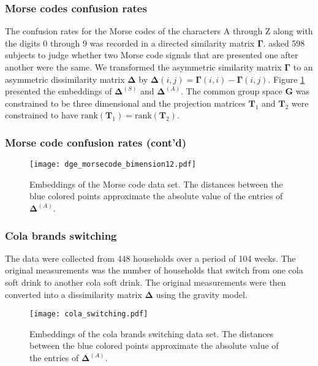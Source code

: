 \documentclass[professionalfonts,hyperref={pdfpagelabels=false,colorlinks=true,linkcolor=cyan}]{beamer}
\begin{document}
\begin{frame}
  \frametitle{Morse codes confusion rates}
  The confusion rates for the Morse codes of the characters A through
  Z along with the digits 0 through 9 was recorded in a directed
  similarity matrix $\mathbf{\Gamma}$. \cite{rothkopf57} asked 598
  subjects to judge whether two Morse code signals that are presented
  one after another were the same. We transformed the asymmetric
  similarity matrix $\bm{\Gamma}$ to an asymmetric dissimilarity
  matrix $\bm{\Delta}$ by $\bm{\Delta}(i,j) = \bm{\Gamma}(i,i) -
  \bm{\Gamma}(i,j)$. Figure \ref{fig:morsecode} presented the
  embeddings of $\bm{\Delta}^{(S)}$ and $\bm{\Delta}^{(A)}$. The
  common group space $\mathbf{G}$ was constrained to be three
  dimensional and the projection matrices $\mathbf{T}_1$ and
  $\mathbf{T}_2$ were constrained to have $\mathrm{rank}(\mathbf{T}_1)
  = \mathrm{rank}(\mathbf{T}_2)$. 
\end{frame}
\begin{frame}
  \frametitle{Morse code confusion rates (cont'd)}
\begin{figure}[htbp]
  \centering
    \texttt{[image: dge\_morsecode\_bimension12.pdf]}
    \caption{Embeddings of the Morse code data set. The
      distances between the blue colored points approximate the
      absolute value of the entries of $\bm{\Delta}^{(A)}$.}
  \label{fig:morsecode}
\end{figure}
\end{frame}

\begin{frame}
  \frametitle{Cola brands switching}
  The data were collected from 448 households over a period of 104
  weeks. The original measurements was the number of households that
  switch from one cola soft drink to another cola soft drink. The
  original measurements were then converted into a dissimilarity
  matrix $\bm{\Delta}$ using the gravity model. 
\begin{figure}[htbp]
  \centering
    \texttt{[image: cola\_switching.pdf]}
    \caption{Embeddings of the cola brands switching data
      set. The distances between the blue colored points approximate
      the absolute value of the entries of $\bm{\Delta}^{(A)}$.}
  \label{fig:colaswitch}
\end{figure}
\end{frame}
\begin{frame}

\end{frame}
\end{document}
